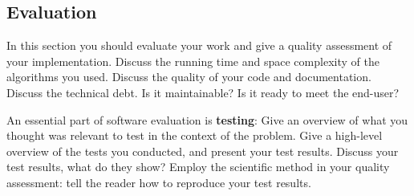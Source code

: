 \subsection{Evaluation}

\label{sec:evaluation}

In this section you should evaluate your work and give a quality assessment of
your implementation. Discuss the running time and space complexity of the
algorithms you used. Discuss the quality of your code and documentation.
Discuss the technical debt. Is it maintainable? Is it ready to meet the
end-user?

An essential part of software evaluation is \textbf{testing}: Give an overview
of what you thought was relevant to test in the context of the problem. Give a
high-level overview of the tests you conducted, and present your test results.
Discuss your test results, what do they show?  Employ the scientific method in
your quality assessment: tell the reader how to reproduce your test results.
